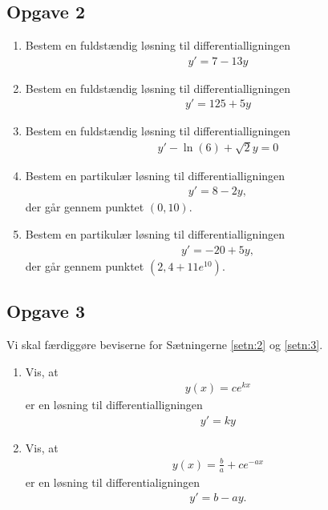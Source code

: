 \subsection*{Opgave 2}
\begin{enumerate}[label=\roman*)]
	\item Bestem en fuldstændig løsning til differentialligningen 
	\begin{align*}
		y' = 7-13y
	\end{align*}
	\item Bestem en fuldstændig løsning til differentialligningen 
	\begin{align*}
		y' = 125 + 5y
	\end{align*}
	\item Bestem en fuldstændig løsning til differentialligningen 
	\begin{align*}
		y' -\ln(6)+\sqrt{2}y=0
	\end{align*}
	\item Bestem en partikulær løsning til differentialligningen 
	\begin{align*}
		y' = 8-2y,
	\end{align*}
	der går gennem punktet $(0,10)$. 
	\item Bestem en partikulær løsning til differentialligningen 
	\begin{align*}
		y' = -20 + 5y,
	\end{align*}
	der går gennem punktet $(2,4 + 11e^{10})$. 
\end{enumerate}
\subsection*{Opgave 3}
Vi skal færdiggøre beviserne for Sætningerne \ref{setn:2} og \ref{setn:3}.
\begin{enumerate}[label=\roman*)]
	\item Vis, at 
	\begin{align*}
		y(x) = ce^{kx}
	\end{align*}
	er en løsning til differentialligningen
	\begin{align*}
		y' = ky
	\end{align*}
	\item Vis, at 
	\begin{align*}
		y(x) = \frac{b}{a} + ce^{-ax}
	\end{align*}
	er en løsning til differentialigningen 
	\begin{align*}
		y' = b-ay.
	\end{align*}
\end{enumerate}


